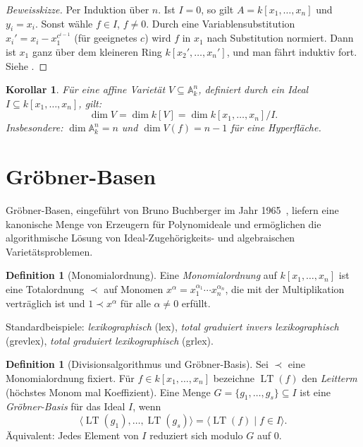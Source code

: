 \documentclass[12pt,a4paper]{amsart}
\newtheorem{corollary}[theorem]{Korollar}
\theoremstyle{definition}
\newtheorem{definition}[theorem]{Definition}
\theoremstyle{definition}
\begin{document}
\begin{proof}[Beweissk{}izze]
Per Induktion über $n$. Ist $I = 0$, so gilt $A = k[x_1,\ldots,x_n]$ und $y_i = x_i$.
Sonst wähle $f \in I$, $f \neq 0$. Durch eine Variablensubstitution $x_i' = x_i -
x_1^{c^{i-1}}$ (für geeignetes $c$) wird $f$ in $x_1$ nach Substitution normiert.
Dann ist $x_1$ ganz über dem kleineren Ring $k[x_2',\ldots,x_n']$, und man fährt
induktiv fort. Siehe \cite[Satz~5.10]{AtiyahMacdonald1969}.
\end{proof}

\begin{corollary}
Für eine affine Varietät $V \subseteq \mathbb{A}^n_k$, definiert durch ein Ideal
$I \subseteq k[x_1,\ldots,x_n]$, gilt:
\[
  \dim V = \dim k[V] = \dim k[x_1,\ldots,x_n]/I.
\]
Insbesondere: $\dim \mathbb{A}^n_k = n$ und $\dim V(f) = n-1$ für eine Hyperfläche.
\end{corollary}

\section{Gröbner-Basen}\label{abschnitt:groebner}

Gröbner-Basen, eingeführt von Bruno Buchberger im Jahr 1965~\cite{Buchberger1970},
liefern eine kanonische Menge von Erzeugern für Polynomideale und ermöglichen die
algorithmische Lösung von Ideal-Zugehörigkeits- und algebraischen Varietätsproblemen.

\begin{definition}[Monomialordnung]
Eine \emph{Monomialordnung} auf $k[x_1,\ldots,x_n]$ ist eine Totalordnung $\prec$
auf Monomen $x^\alpha = x_1^{\alpha_1}\cdots x_n^{\alpha_n}$, die mit der Multiplikation
verträglich ist und $1 \prec x^\alpha$ für alle $\alpha \neq 0$ erfüllt.

Standardbeispiele: \emph{lexikographisch} (lex), \emph{total graduiert invers
lexikographisch} (grevlex), \emph{total graduiert lexikographisch} (grlex).
\end{definition}

\begin{definition}[Divisionsalgorithmus und Gröbner-Basis]
Sei $\prec$ eine Monomialordnung fixiert. Für $f \in k[x_1,\ldots,x_n]$ bezeichne
$\operatorname{LT}(f)$ den \emph{Leitterm} (höchstes Monom mal Koeffizient).
Eine Menge $G = \{g_1,\ldots,g_s\} \subseteq I$ ist eine \emph{Gröbner-Basis} für
das Ideal $I$, wenn
\[
  \langle \operatorname{LT}(g_1), \ldots, \operatorname{LT}(g_s) \rangle
  = \langle \operatorname{LT}(f) \mid f \in I \rangle.
\]
Äquivalent: Jedes Element von $I$ reduziert sich modulo $G$ auf $0$.
\end{definition}
\end{document}
